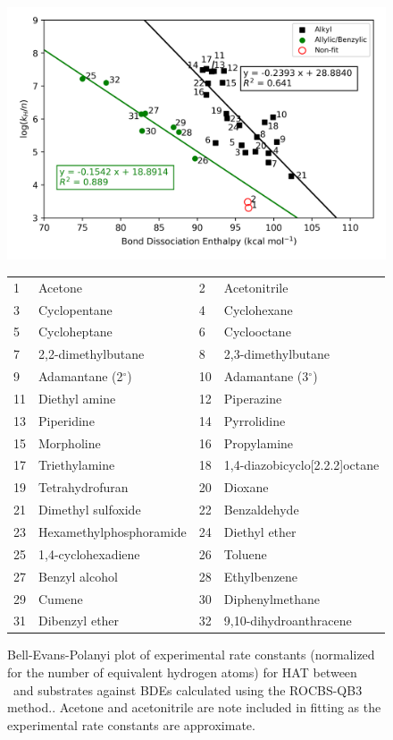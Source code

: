 \begin{figure}[!htbp]
  \centering
  \includegraphics[width=\textwidth]{figures/bde-bep}
\begin{tabularx}{\textwidth}{| l X l X |}
  \hline
  1 & Acetone & 2 & Acetonitrile \\
  3 & Cyclopentane & 4 & Cyclohexane \\
  5 & Cycloheptane & 6 & Cyclooctane \\
  7 & 2,2-dimethylbutane & 8 & 2,3-dimethylbutane \\
  9 & Adamantane (2$^\circ$) & 10 & Adamantane (3$^\circ$) \\
  11 & Diethyl amine & 12 & Piperazine \\
  13 & Piperidine & 14 & Pyrrolidine \\
  15 & Morpholine & 16 & Propylamine \\
  17 & Triethylamine & 18 & 1,4-diazobicyclo[2.2.2]octane \\
  19 & Tetrahydrofuran & 20 & Dioxane \\
  21 & Dimethyl sulfoxide & 22 & Benzaldehyde \\
  23 & Hexamethylphosphoramide & 24 & Diethyl ether \\
  25 & 1,4-cyclohexadiene & 26 & Toluene \\
  27 & Benzyl alcohol & 28 & Ethylbenzene \\
  29 & Cumene & 30 & Diphenylmethane \\
  31 & Dibenzyl ether & 32 & 9,10-dihydroanthracene \\
  \hline
\end{tabularx}
  \caption[Bell-Evans-Polanyi plot of experimental rate constants (normalized for the number of equivalent hydrogen atoms) for HAT between \cumo\ and substrates against BDEs calculated using the ROCBS-QB3 method.]{Bell-Evans-Polanyi plot of experimental rate constants (normalized for the number of equivalent hydrogen atoms) for HAT between \cumo\ and substrates against BDEs calculated using the ROCBS-QB3 method.. Acetone and acetonitrile are note included in fitting as the experimental rate constants are approximate.}
\label{fig:bde-bep}
\end{figure}

